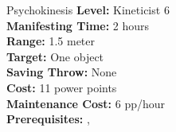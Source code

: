 {Psychokinesis}
{
	\textbf{Level:}
	Kineticist 6\\
	\textbf{Manifesting Time:}
	2 hours\\
	\textbf{Range:}
	1.5 meter\\
	\textbf{Target:}
	One object\\
	\textbf{Saving Throw:}
	None \\
	\textbf{Cost:}
	11 power points\\
	\textbf{Maintenance Cost:}
	6 pp/hour\\
	\textbf{Prerequisites:}
	, \\
}
